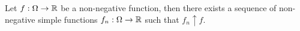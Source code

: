 \begin{lemma}
  Let $f: \Omega \to \mathbb{R}$ be a non-negative function, then there exists a sequence of non-negative simple functions $f_n:\Omega\to\mathbb{R}$ such that $f_n \uparrow f$.
\end{lemma}
